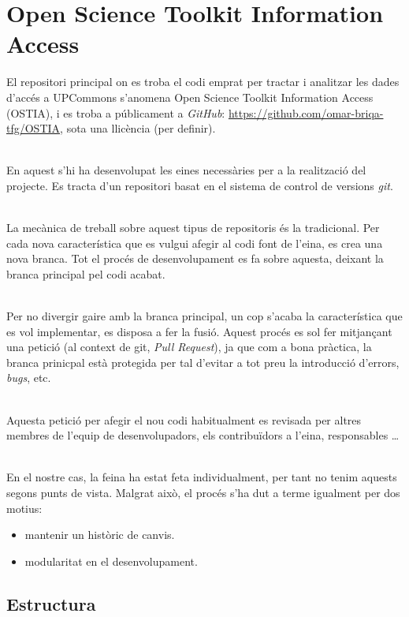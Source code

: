 \chapter{Open Science Toolkit Information Access}\label{ch:ostia}
El repositori principal on es troba el codi emprat per tractar i analitzar les dades d'accés a \gls{UPCommons} s'anomena Open Science Toolkit Information Access (\gls{OSTIA}), i es troba a públicament a \textit{GitHub}: \url{https://github.com/omar-briqa-tfg/OSTIA}, sota una llicència (per definir).

\noindent \\
En aquest s'hi ha desenvolupat les eines necessàries per a la realització del projecte.
Es tracta d'un repositori basat en el sistema de control de versions \textit{\gls{git}}.

\noindent \\
La mecànica de treball sobre aquest tipus de repositoris és la tradicional.
Per cada nova característica que es vulgui afegir al codi font de l'eina, es crea una nova branca.
Tot el procés de desenvolupament es fa sobre aquesta, deixant la branca principal pel codi acabat.

\noindent \\
Per no divergir gaire amb la branca principal, un cop s'acaba la característica que es vol implementar, es disposa a fer la fusió.
Aquest procés es sol fer mitjançant una petició (al context de git, \textit{Pull Request}), ja que com a bona pràctica, la branca prinicpal està protegida per tal d'evitar a tot preu la introducció d'errors, \textit{bugs}, etc.

\noindent \\
Aquesta petició per afegir el nou codi habitualment es revisada per altres membres de l'equip de desenvolupadors, els contribuïdors a l'eina, responsables \dots

\noindent \\
En el nostre cas, la feina ha estat feta individualment, per tant no tenim aquests segons punts de vista.
Malgrat això, el procés s'ha dut a terme igualment per dos motius:

\begin{itemize}
    \item mantenir un històric de canvis.
    \item modularitat en el desenvolupament.
\end{itemize}{}

\clearpage

\section*{Estructura}\label{sec:ostia-structure}

